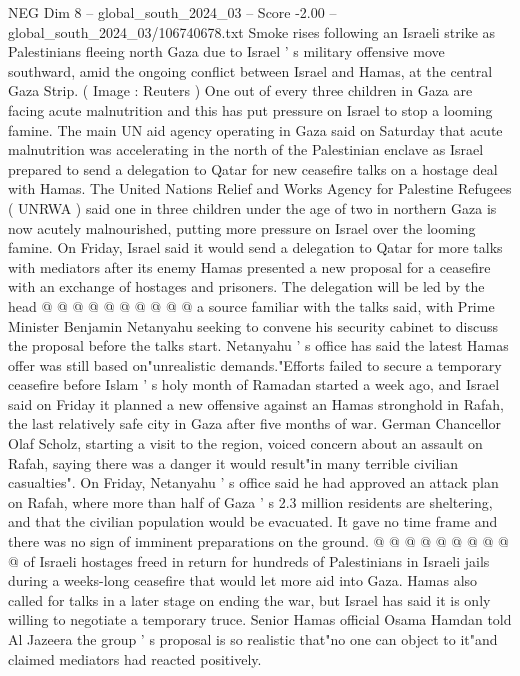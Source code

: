 \begin{textsample}{NEG Dim 8 – global\_south\_2024\_03 – Score -2.00 – global\_south\_2024\_03/106740678.txt}  \label{ex:f8_neg_023}
Smoke rises following an Israeli strike as Palestinians fleeing north Gaza due to Israel ' s military offensive move southward, amid the ongoing conflict between Israel and Hamas, at the central Gaza Strip. ( Image : Reuters ) One out of every three children in Gaza are facing acute malnutrition and this has put pressure on Israel to stop a looming famine.
The main UN aid agency operating in Gaza said on Saturday that acute malnutrition was accelerating in the north of the Palestinian enclave as Israel prepared to send a delegation to Qatar for new ceasefire talks on a hostage deal with Hamas.
The United Nations Relief and Works Agency for Palestine Refugees ( UNRWA ) said one in three children under the age of two in northern Gaza is now acutely malnourished, putting more pressure on Israel over the looming famine.
On Friday, Israel said it would send a delegation to Qatar for more talks with mediators after its enemy Hamas presented a new proposal for a ceasefire with an exchange of hostages and prisoners.
The delegation will be led by the head @ @ @ @ @ @ @ @ @ @ a source familiar with the talks said, with Prime Minister Benjamin Netanyahu seeking to convene his security cabinet to discuss the proposal before the talks start.
Netanyahu ' s office has said the latest Hamas offer was still based on"unrealistic demands."Efforts failed to secure a temporary ceasefire before Islam ' s holy month of Ramadan started a week ago, and Israel said on Friday it planned a new offensive against an Hamas stronghold in Rafah, the last relatively safe city in Gaza after five months of war.
German Chancellor Olaf Scholz, starting a visit to the region, voiced concern about an assault on Rafah, saying there was a danger it would result"in many terrible civilian casualties".
On Friday, Netanyahu ' s office said he had approved an attack plan on Rafah, where more than half of Gaza ' s 2.3 million residents are sheltering, and that the civilian population would be evacuated.
It gave no time frame and there was no sign of imminent preparations on the ground. @ @ @ @ @ @ @ @ @ @ of Israeli hostages freed in return for hundreds of Palestinians in Israeli jails during a weeks-long ceasefire that would let more aid into Gaza.
Hamas also called for talks in a later stage on ending the war, but Israel has said it is only willing to negotiate a temporary truce.
Senior Hamas official Osama Hamdan told Al Jazeera the group ' s proposal is so realistic that"no one can object to it"and claimed mediators had reacted positively.

\end{textsample}
